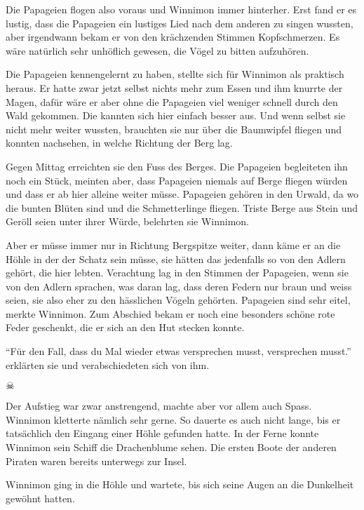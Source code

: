 Die Papageien flogen also voraus und Winnimon immer hinterher. Erst fand er es lustig, dass die Papageien ein lustiges Lied nach dem anderen zu singen wussten, aber irgendwann bekam er von den krächzenden Stimmen Kopfschmerzen. Es wäre natürlich sehr unhöflich gewesen, die Vögel zu bitten aufzuhören. 

Die Papageien kennengelernt zu haben, stellte sich für Winnimon als praktisch heraus. Er hatte zwar jetzt selbst nichts mehr zum Essen und ihm knurrte der Magen, dafür wäre er aber ohne die Papageien viel weniger schnell durch den Wald gekommen. Die kannten sich hier einfach besser aus. Und wenn selbst sie nicht mehr weiter wussten, brauchten sie nur über die Baumwipfel fliegen und konnten nachsehen, in welche Richtung der Berg lag.

Gegen Mittag erreichten sie den Fuss des Berges. Die Papageien begleiteten ihn noch ein Stück, meinten aber, dass Papageien niemals auf Berge fliegen würden und dass er ab hier alleine weiter müsse. Papageien gehören in den Urwald, da wo die bunten Blüten sind und die Schmetterlinge fliegen. Triste Berge aus Stein und Geröll seien unter ihrer Würde, belehrten sie Winnimon.

Aber er müsse immer nur in Richtung Bergspitze weiter, dann käme er an die Höhle in der der Schatz sein müsse, sie hätten das jedenfalls so von den Adlern gehört, die hier lebten. Verachtung lag in den Stimmen der Papageien, wenn sie von den Adlern sprachen, was daran lag, dass deren Federn nur braun und weiss seien, sie also eher zu den hässlichen Vögeln gehörten. Papageien sind sehr eitel, merkte Winnimon. Zum Abschied bekam er noch eine besonders schöne rote Feder geschenkt, die er sich an den Hut stecken konnte. 

\enquote{Für den Fall, dass du Mal wieder etwas versprechen musst, versprechen musst.} erklärten sie und verabschiedeten sich von ihm.

\begin{center}
{\huge $\skull$}
\end{center}

Der Aufstieg war zwar anstrengend, machte aber vor allem auch Spass. Winnimon kletterte nämlich sehr gerne. So dauerte es auch nicht lange, bis er tatsächlich den Eingang einer Höhle gefunden hatte. In der Ferne konnte Winnimon sein Schiff die Drachenblume sehen. Die ersten Boote der anderen Piraten waren bereits unterwegs zur Insel.


Winnimon ging in die Höhle und wartete, bis sich seine Augen an die Dunkelheit gewöhnt hatten.

